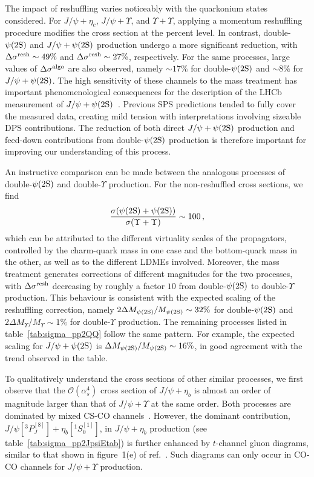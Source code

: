 The impact of reshuffling varies noticeably with the quarkonium states considered. For $J/\psi + \eta_c$, $J/\psi + \Upsilon$, and $\Upsilon + \Upsilon$, applying a momentum reshuffling procedure modifies the cross section at the percent level. In contrast, double-$\psi(2\mathrm{S})$ and $J/\psi + \psi(2\mathrm{S})$ production undergo a more significant reduction, with $\Delta\sigma^{\rm resh}\sim49\%$ and $\Delta\sigma^{\rm resh}\sim27\%$, respectively. For the same processes, large values of $\Delta\sigma^{\rm algo}$ are also observed, namely $\sim17\%$ for double-$\psi(2\mathrm{S})$ and $\sim8\%$ for $J/\psi + \psi(2\mathrm{S})$. The high sensitivity of these channels to the mass treatment has important phenomenological consequences for the description of the LHCb measurement of $J/\psi + \psi(2\mathrm{S})$~\cite{LHCb:2023wsl}.
Previous SPS predictions tended to fully cover the measured data, creating mild tension with interpretations involving sizeable DPS contributions. The reduction of both direct $J/\psi + \psi(2\mathrm{S})$ production and feed-down contributions from double-$\psi(2\mathrm{S})$ production is therefore important for improving our understanding of this process. 

An instructive comparison can be made between the analogous processes of double-$\psi(2\mathrm{S})$ and double-$\Upsilon$ production. For the non-reshuffled cross sections, we find 
$$\dfrac{\sigma\!\left(\psi(2\mathrm{S})+\psi(2\mathrm{S})\right)}{{\sigma\!\left(\Upsilon+\Upsilon\right)}} \sim 100\,,$$ which can be attributed to the different virtuality scales of the propagators, controlled by the charm-quark mass in one case and the bottom-quark mass in the other, as well as to the different LDMEs involved.
Moreover, the mass treatment generates corrections of different magnitudes for the two processes, with $\Delta\sigma^{\rm resh}$ decreasing by roughly a factor $10$ from double-$\psi(2\mathrm{S})$ to double-$\Upsilon$ production. This behaviour is consistent with the expected scaling of the reshuffling correction, namely $2\Delta M_{\psi(2\mathrm{S})}/M_{\psi(2\mathrm{S})} \sim 32\%$ for double-$\psi(2\mathrm{S})$ and $2\Delta M_{\Upsilon}/M_{\Upsilon}\sim 1\%$ for double-$\Upsilon$ production.
The remaining processes listed in table~\ref{tab:sigma_pp2QQ} follow the same pattern. For example, the expected scaling for $J/\psi + \psi(2\mathrm{S})$ is $\Delta M_{\psi(2\mathrm{S})}/M_{\psi(2\mathrm{S})} \sim 16\%$, in good agreement with the trend observed in the table.

To qualitatively understand the cross sections of other similar processes, we first observe that the $\mathcal{O}(\alpha_s^4)$ cross section of $J/\psi+\eta_b$ is almost an order of magnitude larger than that of $J/\psi+\Upsilon$ at the same order. Both processes are dominated by mixed CS-CO channels~\cite{Shao:2016wor}. However, the dominant contribution, $J/\psi[^3P_J^{[8]}]+\eta_b[^1S_0^{[1]}]$, in $J/\psi+\eta_b$ production (see table~\ref{tab:sigma_pp2JpsiEtab}) is further enhanced by $t$-channel gluon diagrams, similar to that shown in figure~1(e) of ref.~\cite{Shao:2016wor}. Such diagrams can only occur in CO-CO channels for $J/\psi+\Upsilon$ production.

